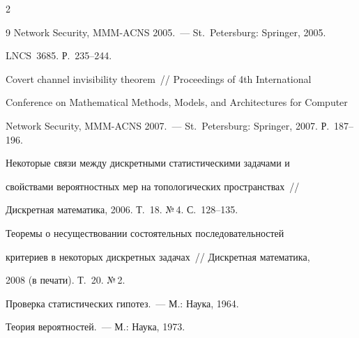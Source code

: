 \begin{multicols}{2}
{{\begin{thebibliography}{9}
Network Security, MMM-ACNS 2005.~--- St.~Petersburg: Springer, 2005.  


LNCS~3685.  Р.~235--244.









Covert channel invisibility theorem~// Proceedings of 4th International 


Conference on Mathematical Methods, Models, and Architectures for Computer 


Network Security, MMM-ACNS 2007.~--- St.~Petersburg: Springer, 2007. Р.~187--196.









Некоторые связи между дискретными статистическими задачами и 


свойствами вероятностных мер на топологических пространствах~// 


Дискретная математика, 2006.  Т.~18. №\,4. С.~128--135.









Теоремы о несуществовании состоятельных последовательностей 


критериев в некоторых дискретных задачах~// Дискретная математика, 


2008  (в печати). Т.~20. №\,2.









Проверка статистических гипотез.~--- М.: Наука,  1964.


\label{end\stat}









Теория вероятностей.~--- М.: Наука, 1973.








\end{thebibliography}


}


}


\end{multicols}    


 


 


 


 


